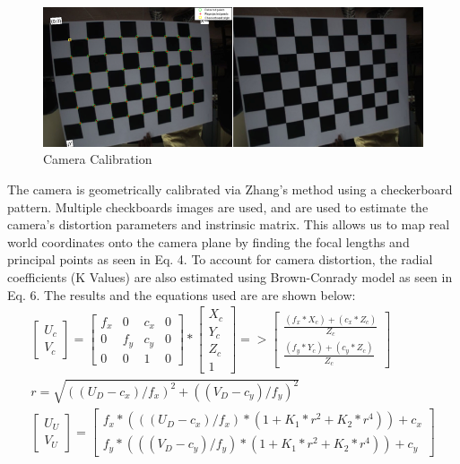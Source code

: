 \documentclass[15pt]{article}
\begin{document}
\begin{figure}[h!]
  \centering
  \includegraphics[scale=0.3]{camera}
  \captionsetup{justification=centering}
  \caption{Camera Calibration}
\end{figure}

The camera is geometrically calibrated via Zhang’s method \cite{Sturm1999} using a checkerboard pattern. Multiple checkboards images are used, and are used to estimate the camera’s distortion parameters and instrinsic matrix. This allows us to map real world coordinates onto the camera plane by finding the focal lengths and principal points as seen in Eq. 4. To account for camera distortion, the radial coefficients (K Values) are also estimated using Brown-Conrady model as seen in Eq. 6. The results and the equations used are are shown below:
\begin{gather}
\left[\begin{array}{c}
U_{c}\\
V_{c}
\end{array}\right]=\left[\begin{array}{cccc}
f_{x} & 0 & c_{x} & 0\\
0 & f_{y} & c_{y} & 0\\
0 & 0 & 1 & 0
\end{array}\right]*\left[\begin{array}{c}
X_{c}\\
Y_{c}\\
Z_{c}\\
1
\end{array}\right]=>\left[\begin{array}{c}
\frac{(f_{x}*X_{c})+(c_{x}*Z_{c})}{Z_{c}}\\
\frac{(f_{y}*Y_{c})+(c_{y}*Z_{c})}{Z_{c}}
\end{array}\right] \\
r=\sqrt{((U_{D}-c_{x})/f_{x})^{2}+((V_{D}-c_{y})/f_{y})^{2}} \\
\left[\begin{array}{c}
U_{U}\\
V_{U}
\end{array}\right]=\left[\begin{array}{c}
f_{x}*(((U_{D}-c_{x})/f_{x})*(1+K_{1}*r^{2}+K_{2}*r^{4}))+c_{x}\\
f_{y}*(((V_{D}-c_{y})/f_{y})*(1+K_{1}*r^{2}+K_{2}*r^{4}))+c_{y}
\end{array}\right]
\end{gather}
\end{document}

